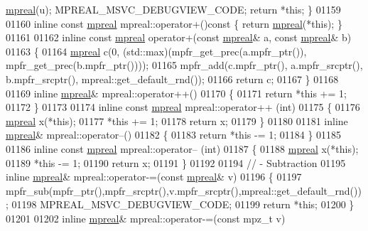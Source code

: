 \begin{DoxyCode}
      \hyperlink{classmpfr_1_1mpreal}{mpreal}(u); MPREAL\_MSVC\_DEBUGVIEW\_CODE; \textcolor{keywordflow}{return} *\textcolor{keyword}{this};    \}
01159 
01160 \textcolor{keyword}{inline} \textcolor{keyword}{const} \hyperlink{classmpfr_1_1mpreal}{mpreal} mpreal::operator+()\textcolor{keyword}{const    }\{    \textcolor{keywordflow}{return} \hyperlink{classmpfr_1_1mpreal}{mpreal}(*\textcolor{keyword}{this}); \}
01161 
01162 \textcolor{keyword}{inline} \textcolor{keyword}{const} \hyperlink{classmpfr_1_1mpreal}{mpreal} operator+(\textcolor{keyword}{const} \hyperlink{classmpfr_1_1mpreal}{mpreal}& a, \textcolor{keyword}{const} \hyperlink{classmpfr_1_1mpreal}{mpreal}& b)
01163 \{
01164   \hyperlink{classmpfr_1_1mpreal}{mpreal} c(0, (std::max)(mpfr\_get\_prec(a.mpfr\_ptr()), mpfr\_get\_prec(b.mpfr\_ptr())));
01165   mpfr\_add(c.mpfr\_ptr(), a.mpfr\_srcptr(), b.mpfr\_srcptr(), mpreal::get\_default\_rnd());
01166   \textcolor{keywordflow}{return} c;
01167 \}
01168 
01169 \textcolor{keyword}{inline} \hyperlink{classmpfr_1_1mpreal}{mpreal}& mpreal::operator++()
01170 \{
01171     \textcolor{keywordflow}{return} *\textcolor{keyword}{this} += 1;
01172 \}
01173 
01174 \textcolor{keyword}{inline} \textcolor{keyword}{const} \hyperlink{classmpfr_1_1mpreal}{mpreal} mpreal::operator++ (\textcolor{keywordtype}{int})
01175 \{
01176     \hyperlink{classmpfr_1_1mpreal}{mpreal} x(*\textcolor{keyword}{this});
01177     *\textcolor{keyword}{this} += 1;
01178     \textcolor{keywordflow}{return} x;
01179 \}
01180 
01181 \textcolor{keyword}{inline} \hyperlink{classmpfr_1_1mpreal}{mpreal}& mpreal::operator--()
01182 \{
01183     \textcolor{keywordflow}{return} *\textcolor{keyword}{this} -= 1;
01184 \}
01185 
01186 \textcolor{keyword}{inline} \textcolor{keyword}{const} \hyperlink{classmpfr_1_1mpreal}{mpreal} mpreal::operator-- (\textcolor{keywordtype}{int})
01187 \{
01188     \hyperlink{classmpfr_1_1mpreal}{mpreal} x(*\textcolor{keyword}{this});
01189     *\textcolor{keyword}{this} -= 1;
01190     \textcolor{keywordflow}{return} x;
01191 \}
01192 
01194 \textcolor{comment}{// - Subtraction}
01195 \textcolor{keyword}{inline} \hyperlink{classmpfr_1_1mpreal}{mpreal}& mpreal::operator-=(\textcolor{keyword}{const} \hyperlink{classmpfr_1_1mpreal}{mpreal}& v)
01196 \{
01197     mpfr\_sub(mpfr\_ptr(),mpfr\_srcptr(),v.mpfr\_srcptr(),mpreal::get\_default\_rnd());
01198     MPREAL\_MSVC\_DEBUGVIEW\_CODE;
01199     \textcolor{keywordflow}{return} *\textcolor{keyword}{this};
01200 \}
01201 
01202 \textcolor{keyword}{inline} \hyperlink{classmpfr_1_1mpreal}{mpreal}& mpreal::operator-=(\textcolor{keyword}{const} mpz\_t v)

\end{DoxyCode}
